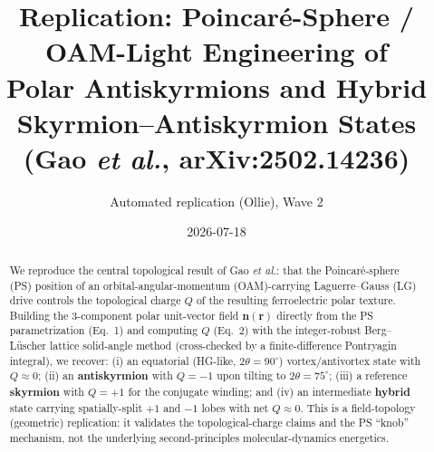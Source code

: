 \documentclass[11pt]{article}
\title{Replication: Poincar\'e-Sphere / OAM-Light Engineering of\\
Polar Antiskyrmions and Hybrid Skyrmion--Antiskyrmion States\\
\large (Gao \textit{et al.}, arXiv:2502.14236)}
\author{Automated replication (Ollie), Wave 2}
\date{2026-07-18}
\begin{document}
\maketitle

\begin{abstract}
We reproduce the central topological result of Gao \textit{et al.}: that the
Poincar\'e-sphere (PS) position of an orbital-angular-momentum (OAM)-carrying
Laguerre--Gauss (LG) drive controls the topological charge $Q$ of the resulting
ferroelectric polar texture. Building the 3-component polar unit-vector field
$\mathbf{n}(\mathbf{r})$ directly from the PS parametrization (Eq.~1) and
computing $Q$ (Eq.~2) with the integer-robust Berg--L\"uscher lattice
solid-angle method (cross-checked by a finite-difference Pontryagin integral),
we recover: (i) an equatorial (HG-like, $2\theta=90^\circ$) vortex/antivortex
state with $Q\approx0$; (ii) an \textbf{antiskyrmion} with $Q=-1$ upon tilting
to $2\theta=75^\circ$; (iii) a reference \textbf{skyrmion} with $Q=+1$ for the
conjugate winding; and (iv) an intermediate \textbf{hybrid} state carrying
spatially-split $+1$ and $-1$ lobes with net $Q\approx0$. This is a
field-topology (geometric) replication: it validates the topological-charge
claims and the PS ``knob'' mechanism, not the underlying second-principles
molecular-dynamics energetics.
\end{abstract}
\end{document}
